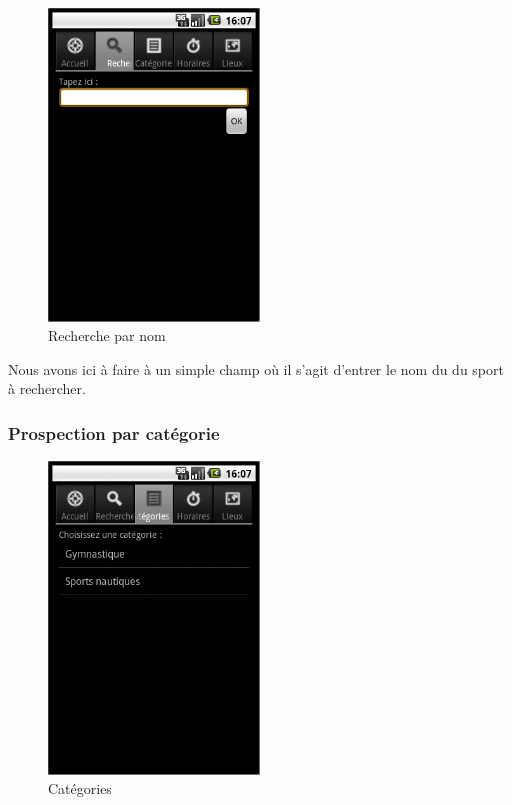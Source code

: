 \documentclass{article}
\begin{document}
		\begin{figure}[ht]
			\centering
			\includegraphics[width=0.5\textwidth]{recherche.png}
			\caption{Recherche par nom}
			\label{fig:recherche}
		\end{figure}

		Nous avons ici à faire à un simple champ où il s'agit d'entrer le nom du
		du sport à rechercher.

		\subsubsection{Prospection par catégorie}

		\begin{figure}[ht]
			\centering
			\includegraphics[width=0.5\textwidth]{categories.png}
			\caption{Catégories}
			\label{fig:categories}
		\end{figure}
\end{document}
